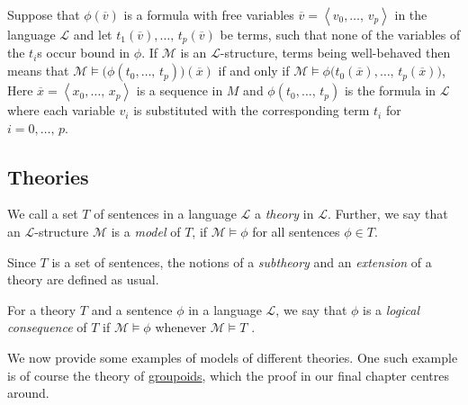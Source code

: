 \documentclass[../../main.tex]{subfiles}
\begin{document}
Suppose that $\phi(\overline{v})$ is a formula with free variables $\overline{v} = \left<v_0,\ldots,\, v_p\right>$ in the language $\mathcal{L}$ and let $t_1(\overline{v}),\ldots,\, t_p(\overline{v})$ be terms, 
such that none of the variables of the $t_i$s occur bound in $\phi$.
If $\mathcal{M}$ is an $\mathcal{L}$-structure,
terms being well-behaved then means that $\mathcal{M} \models \big(\phi(t_0,\ldots,\, t_p)\big)(\overline{x})$ if and only if $\mathcal{M} \models  \phi\big(t_0(\overline{x}) ,\ldots,\, t_p(\overline{x})\big)$,
Here $\overline{x} = \left<x_0,\ldots,\, x_p\right>$ is a sequence in $M$ and $\phi(t_0,\ldots,\, t_p)$ is the formula in $\mathcal{L}$ where each variable $v_i$ is substituted with the corresponding term $t_i$ for $i = 0,\ldots,\, p$.

\subsection{Theories}
\begin{definition}[Theory]\cite[\S.1.2]{Mar02}\cite[\S 1.4]{Cha90}
    We call a set $T$ of sentences in a language $\mathcal{L}$ a \emph{theory} in $\mathcal{L}$.
    Further, we say that an $\mathcal{L}$-structure $\mathcal{M}$ is a \emph{model} of $T$,
    if $\mathcal{M} \models \phi$ for all sentences $\phi \in T$.

    Since $T$ is a set of sentences, the notions of a \emph{subtheory} and an \emph{extension} of a theory are defined as usual.
\end{definition}
For a theory $T$ and a sentence $\phi$ in a language $\mathcal{L}$,
we say that $\phi$ is a \emph{logical consequence} of $T$ if $\mathcal{M} \models \phi$ whenever $\mathcal{M} \models T$ \cite[Definition 1.2.12]{Mar02}.

We now provide some examples of models of different theories.
One such example is of course the theory of \hyperref[groupoid-def]{groupoids}, which the proof in our final chapter centres around.
\end{document}
